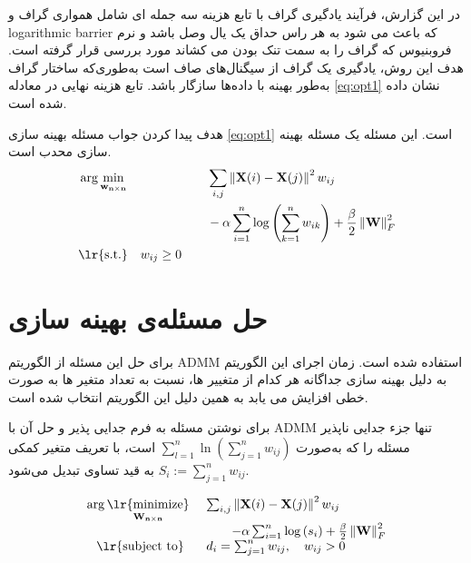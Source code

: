 \documentclass[10pt,twocolumn,a4paper]{article}
\newcommand\minimize[1]{\mathop{\text{\lr{minimize}}}\limits_{#1}\ }
\begin{document}
    	در این گزارش، فرآیند یادگیری گراف با تابع هزینه سه جمله ای شامل همواری گراف و logarithmic barrier که باعث می شود به هر راس حداق یک یال وصل باشد و نرم فروبنیوس که گراف را به سمت تنک بودن می کشاند\cite{Kalofolias2016} 
    	مورد بررسی قرار گرفته است. هدف این روش، یادگیری یک گراف از سیگنال‌های صاف
     است به‌طوری‌که ساختار گراف به‌طور بهینه با داده‌ها سازگار باشد. تابع هزینه نهایی در معادله 
      \ref{eq:opt1}
      نشان داده شده است.

	هدف پیدا کردن جواب مسئله بهینه سازی
\ref{eq:opt1}
است. این مسئله یک مسئله بهینه سازی محدب است. 
\begin{equation}\label{eq:opt1}
	\begin{aligned}
		&\arg \min_{\mathbf{w_{n \times n}}}&\quad &\sum_{i,j} \left\| \mathbf{X}(i) - \mathbf{X}(j) \right\|^2 w_{ij} \\
		& &\quad &- \alpha \sum_{i=1}^{n} \log \left( \sum_{k=1}^{n} w_{ik} \right) + \frac{\beta}{2} \left\| \mathbf{W} \right\|_F^2 \\
		& \text{\lr{s.t.}} \quad w_{ij} \geq 0
	\end{aligned}
\end{equation}
	\section{حل مسئله‌ی بهینه سازی} \label{sec:optsol}

برای حل این مسئله از الگوریتم ADMM استفاده شده است. زمان اجرای این الگوریتم به دلیل بهینه سازی جداگانه هر کدام از متغییر ها، نسبت به تعداد متغیر ها به صورت خطی افزایش می یابد به همین دلیل این الگوریتم انتخاب شده است.

برای نوشتن مسئله به فرم جدایی پذیر و حل آن با ADMM تنها جزء جدایی ناپذیر
مسئله را که به‌صورت
$
\sum_{l=1}^{n} \ln \left( \sum_{j=1}^{n} w_{ij} \right)
$
است، با تعریف متغیر کمکی 	$S_i := \sum_{j=1}^{n} w_{ij}$	به قید تساوی تبدیل می‌شود.



\begin{equation}\label{eq:opt2}
	\begin{array}{cl}
		\arg \minimize{\mathbf{W_{n \times n}}}&\sum_{i,j} \left\| \mathbf{X}(i) - \mathbf{X}(j) \right\|^2 w_{ij}
		\\&\qquad- \alpha \sum_{i=1}^{n} \log \left( s_i \right) + \frac{\beta}{2} \left\| \mathbf{W} \right\|_F^2 \\
		\text{\lr{subject to}} &d_i = \sum_{j=1}^{n} w_{ij}, \quad w_{ij} > 0
	\end{array}
\end{equation}
\end{document}
